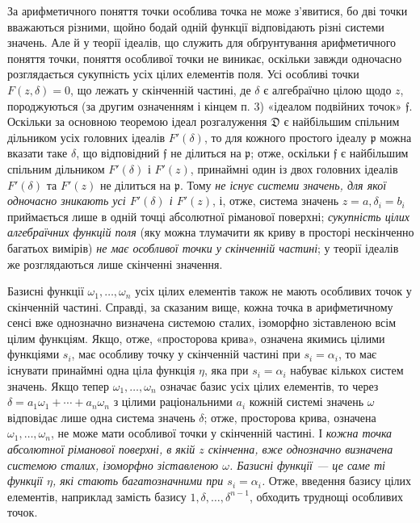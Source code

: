 \documentclass[11pt]{article}
\providecommand{\frD}{\mathfrak D}
\providecommand{\frf}{\mathfrak f}
\providecommand{\frp}{\mathfrak p}
\begin{document}
За арифметичного поняття точки особлива точка не може з'явитися, бо дві точки вважаються різними, щойно бодай одній функції відповідають різні системи значень. Але й у теорії ідеалів, що служить для обґрунтування арифметичного поняття точки, поняття особливої точки не виникає, оскільки завжди одночасно розглядається сукупність усіх цілих елементів поля. Усі особливі точки \(F(z,\delta)=0\), що лежать у скінченній частині, де \(\delta\) є алгебраїчно цілою щодо \(z\), породжуються (за другим означенням і кінцем п. 3) «ідеалом подвійних точок» \(\frf\). Оскільки за основною теоремою ідеал розгалуження \(\frD\) є найбільшим спільним дільником усіх головних ідеалів \(F'(\delta)\), то для кожного простого ідеалу \(\frp\) можна вказати таке \(\delta\), що відповідний \(\frf\) не ділиться на \(\frp\); отже, оскільки \(\frf\) є найбільшим спільним дільником \(F'(\delta)\) і \(F'(z)\), принаймні один із двох головних ідеалів \(F'(\delta)\) та \(F'(z)\) не ділиться на \(\frp\). Тому \emph{не існує системи значень, для якої одночасно зникають усі \(F'(\delta)\) і \(F'(z)\)}, і, отже, система значень \(z=a,\delta_i=b_i\) приймається лише в одній точці абсолютної ріманової поверхні; \emph{сукупність цілих алгебраїчних функцій поля} (яку можна тлумачити як криву в просторі нескінченно багатьох вимірів) \emph{не має особливої точки у скінченній частині}; у теорії ідеалів же розглядаються лише скінченні значення.

Базисні функції \(\omega_1,\ldots,\omega_n\) усіх цілих елементів також не мають особливих точок у скінченній частині. Справді, за сказаним вище, кожна точка в арифметичному сенсі вже однозначно визначена системою сталих, ізоморфно зіставленою всім цілим функціям. Якщо, отже, «просторова крива», означена якимись цілими функціями \(s_i\), має особливу точку у скінченній частині при \(s_i=\alpha_i\), то має існувати принаймні одна ціла функція \(\eta\), яка при \(s_i=\alpha_i\) набуває кількох систем значень. Якщо тепер \(\omega_1,\ldots,\omega_n\) означає базис усіх цілих елементів, то через \(\delta=a_1\omega_1+\cdots+a_n\omega_n\) з цілими раціональними \(a_i\) кожній системі значень \(\omega\) відповідає лише одна система значень \(\delta\); отже, просторова крива, означена \(\omega_1,\ldots,\omega_n\), не може мати особливої точки у скінченній частині. І \emph{кожна точка абсолютної ріманової поверхні, в якій \(z\) скінченна, вже однозначно визначена системою сталих, ізоморфно зіставленою \(\omega\). Базисні функції --- це саме ті функції \(\eta\), які стають багатозначними при \(s_i=\alpha_i\).} Отже, введення базису цілих елементів, наприклад замість базису \(1,\delta,\ldots,\delta^{n-1}\), обходить труднощі особливих точок.
\end{document}
